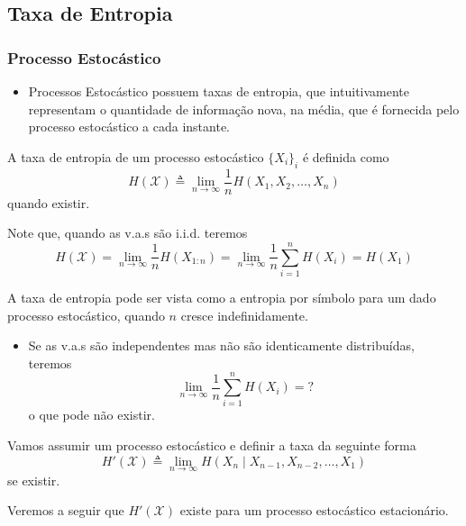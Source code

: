 \subsection{Taxa de Entropia}
\begin{frame}[allowframebreaks]
  \frametitle{Processo Estocástico}
  \begin{itemize}
  \item Processos Estocástico possuem taxas de entropia, que intuitivamente representam o quantidade de 
	informação nova, na média, que é fornecida pelo processo estocástico a cada instante.
  \end{itemize}

  \begin{definition}
  A taxa de entropia de um processo estocástico $\{ X_i \}_i$ é definida como
	\begin{equation}
	H(\mathcal{X}) \triangleq \lim_{n \rightarrow \infty} \frac{1}{n} H(X_1, X_2, \ldots, X_n)
	\end{equation}
  quando existir.
  \end{definition}
  Note que, quando as v.a.s são i.i.d. teremos %
  \begin{equation}
	H(\mathcal{X}) = \lim_{n \rightarrow \infty} \frac{1}{n} H(X_{1:n}) = \lim_{n \rightarrow \infty} \frac{1}{n} \sum_{i=1}^n H(X_i) = H(X_1)
  \end{equation}

  A taxa de entropia pode ser vista como a entropia por símbolo para um dado processo estocástico, quando $n$ cresce indefinidamente.

  \framebreak

  \begin{example}
  \begin{itemize}
  \item Se as v.a.s são independentes mas não são identicamente distribuídas, teremos
	\begin{equation}
	\lim_{n \rightarrow \infty} \frac{1}{n} \sum_{i=1}^n H(X_i) = ?
	\end{equation}
	o que pode não existir.
  \end{itemize} 
  \end{example}

 
  \framebreak

  \begin{definition}
  Vamos assumir um processo estocástico e definir a taxa da seguinte forma
	\begin{equation}
	H'(\mathcal{X}) \triangleq \lim_{n \rightarrow \infty} H(X_n \mid X_{n-1}, X_{n-2}, \ldots , X_1)
        \end{equation}
  se existir.
  \end{definition}
  Veremos a seguir que $H'(\mathcal{X})$ existe para um processo estocástico estacionário.
 

\end{frame}
